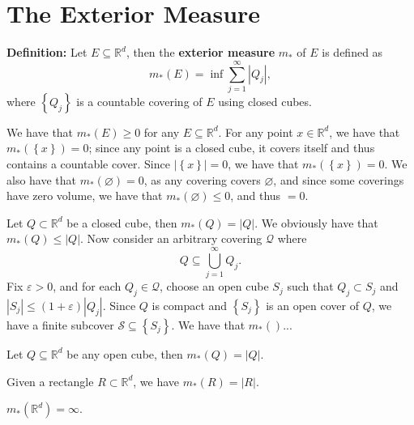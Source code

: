 \documentclass[12pt]{article}
\newcommand{\R}{\mathbb{R}}
\newcommand{\braceb}[1]{\left\{#1\right\}}
\newcommand{\vertb}[1]{\left\vert#1\right\vert}
\begin{document}
\pagestyle{fancy}

\setlength{\parindent}{0in}
\setlength{\parskip}{0.1in}

\section*{The Exterior Measure}

\textbf{Definition:} Let \( E \subseteq \R^d \), then the
\textbf{exterior measure} \( m_* \) of \( E \) is defined as
\[
	m_*(E) = \inf \sum_{j = 1}^\infty \vertb{Q_j},
\]
where \( \braceb{Q_j} \) is a countable covering of \( E \) using closed cubes.

We have that \( m_*(E) \geq 0 \) for any \( E \subseteq \R^d \).
For any point \( x \in \R^d \), we have that \( m_*(\braceb{x}) = 0 \); since
any point is a closed cube, it covers itself and thus contains a countable
cover. Since \( \vertb{\braceb{x}} = 0 \), we have that
\( m_*(\braceb{x}) = 0 \).
We also have that \( m_*(\varnothing) = 0 \), as any covering covers
\( \varnothing \), and since some coverings have zero volume, we have that
\( m_*(\varnothing) \leq 0 \), and thus \( = 0 \).

Let \( Q \subset \R^d \) be a closed cube, then \( m_*(Q) = \vertb{Q} \).
We obviously have that \( m_*(Q) \leq \vertb{Q} \).
Now consider an arbitrary covering \( \mathcal{Q} \) where
\[
	Q \subseteq \bigcup_{j = 1}^\infty Q_j.
\]
Fix \( \varepsilon > 0 \), and for each \( Q_j \in \mathcal{Q} \), choose
an open cube \( S_j \) such that \( Q_j \subset S_j\) and
\( \vertb{S_j} \leq (1 + \varepsilon)\vertb{Q_j} \).
Since \( Q \) is compact and \( \braceb{S_j} \) is an open cover
of \( Q \), we have a finite subcover \( \mathcal{S} \subseteq \braceb{S_j} \).
We have that \( m_*() \)...

Let \( Q \subseteq \R^d \) be any open cube, then \( m_*(Q) = \vertb{Q} \).

Given a rectangle \( R \subset \R^d \), we have \( m_*(R) = \vertb{R} \).

\( m_*(\R^d) = \infty \).
\end{document}
